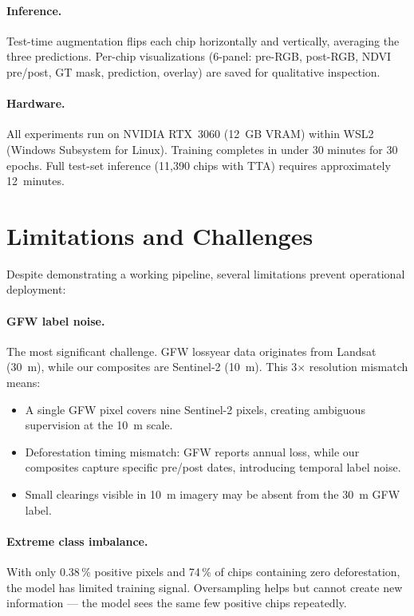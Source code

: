 \documentclass[10pt,a4paper,onecolumn]{article}
\begin{document}
\paragraph{Inference.}
Test-time augmentation flips each chip horizontally and vertically,
averaging the three predictions.  Per-chip visualizations
(6-panel: pre-RGB, post-RGB, NDVI pre/post, GT mask, prediction,
overlay) are saved for qualitative inspection.

\paragraph{Hardware.}
All experiments run on NVIDIA RTX~3060 (12~GB VRAM) within WSL2
(Windows Subsystem for Linux).  Training completes in under 30
minutes for 30 epochs.  Full test-set inference (11,390 chips with
TTA) requires approximately 12~minutes.

\section{Limitations and Challenges}

Despite demonstrating a working pipeline, several limitations prevent
operational deployment:

\paragraph{GFW label noise.}
The most significant challenge.  GFW lossyear data originates from
Landsat (30~m), while our composites are Sentinel-2 (10~m).  This
3$\times$ resolution mismatch means:
\begin{itemize}[nosep]
    \item A single GFW pixel covers nine Sentinel-2 pixels, creating
          ambiguous supervision at the 10~m scale.
    \item Deforestation timing mismatch: GFW reports annual loss,
          while our composites capture specific pre/post dates,
          introducing temporal label noise.
    \item Small clearings visible in 10~m imagery may be absent from
          the 30~m GFW label.
\end{itemize}

\paragraph{Extreme class imbalance.}
With only 0.38\,\% positive pixels and 74\,\% of chips containing
zero deforestation, the model has limited training signal.
Oversampling helps but cannot create new information --- the model
sees the same few positive chips repeatedly.
\end{document}
